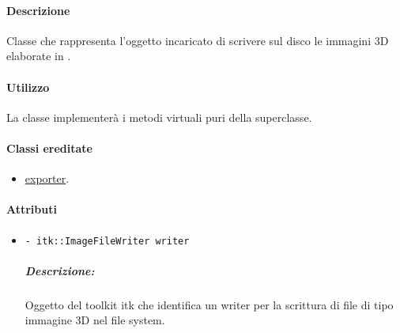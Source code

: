 \paragraph{Descrizione \\}
Classe che rappresenta l'oggetto incaricato di scrivere sul disco le immagini 3D elaborate in \project.
\paragraph{Utilizzo\\}
La classe implementerà i metodi virtuali puri della superclasse.
\paragraph{Classi ereditate\\}
\begin{itemize}
\item \hyperref[spexporter]{exporter}.
\end{itemize}
\paragraph{\color{black}Attributi \\}
	\begin{itemize}
		\item \color{teal}\verb!- itk::ImageFileWriter writer!
		\color{black}
		\subparagraph{Descrizione:} Oggetto del toolkit itk che identifica un writer per la scrittura di file di tipo immagine 3D nel file system.
	\end{itemize}
